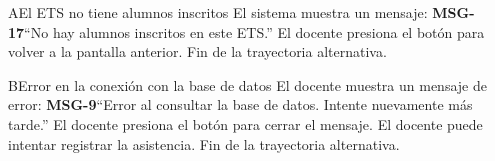 \begin{UCtrayectoriaA}{A}{El ETS no tiene alumnos inscritos}
	\UCpaso El sistema muestra un mensaje: {\bf MSG-17}{``No hay alumnos inscritos en este ETS.''}
	\UCpaso[\UCactor] El docente presiona el botón  para volver a la pantalla anterior.
	\UCpaso Fin de la trayectoria alternativa.
\end{UCtrayectoriaA}
\begin{UCtrayectoriaA}{B}{Error en la conexión con la base de datos}
	\UCpaso[\UCactor] El docente muestra un mensaje de error: {\bf MSG-9}{``Error al consultar la base de datos. Intente nuevamente más tarde.''}
	\UCpaso[\UCactor] El docente presiona el botón  para cerrar el mensaje.
	\UCpaso[\UCactor] El docente puede intentar registrar la asistencia.
	\UCpaso Fin de la trayectoria alternativa.
\end{UCtrayectoriaA}

